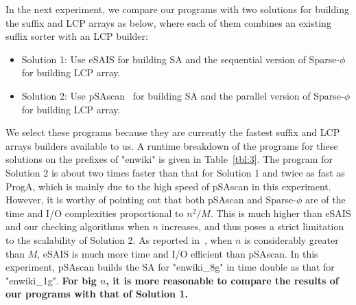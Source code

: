 \documentclass[10pt,journal,compsoc]{IEEEtran}
\begin{document}

In the next experiment, we compare our programs with two solutions for building the suffix and LCP arrays as below, where each of them combines an existing suffix sorter with an LCP builder:


\begin{itemize}
	\item Solution 1: Use eSAIS for building SA and the sequential version of Sparse-$\phi$~\cite{Karkkainen2016} for building LCP array.
	
	\item Solution 2: Use pSAscan~\cite{Karkkainen2015} for building SA and the parallel version of Sparse-$\phi$ for building LCP array.
\end{itemize}


We select these programs because they are currently the fastest suffix and LCP arrays builders available to us. A runtime breakdown of the programs for these solutions on the prefixes of "enwiki" is given in Table~\ref{tbl:3}. The program for Solution 2 is about two times faster than that for Solution 1 and twice as fast as ProgA, which is mainly due to the high speed of pSAscan in this experiment. However, it is worthy of pointing out that both pSAscan and Sparse-$\phi$ are of the time and I/O complexities proportional to $n^2/M$. This is much higher than eSAIS and our checking algorithms when $n$ increases, and thus poses a strict limitation to the scalability of Solution 2. As reported in~\cite{Karkkainen2015}, when $n$ is considerably greater than $M$, eSAIS is much more time and I/O efficient than pSAscan. In this experiment, pSAscan builds the SA for "enwiki\_8g" in time double as that for "enwiki\_1g". {\bf For big $n$, it is more reasonable to compare the results of our programs with that of Solution 1.}
\end{document}
